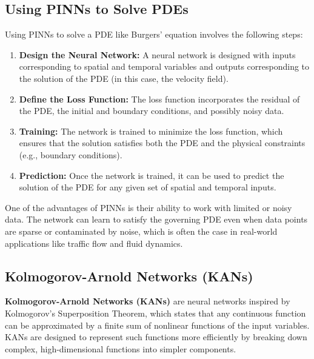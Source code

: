 \documentclass[conference]{IEEEtran}
\begin{document}
\subsection{Using PINNs to Solve PDEs}

Using PINNs to solve a PDE like Burgers’ equation involves the following steps:
\begin{enumerate}
    \item \textbf{Design the Neural Network:} A neural network is designed with inputs corresponding to spatial and temporal variables and outputs corresponding to the solution of the PDE (in this case, the velocity field).
    \item \textbf{Define the Loss Function:} The loss function incorporates the residual of the PDE, the initial and boundary conditions, and possibly noisy data.
    \item \textbf{Training:} The network is trained to minimize the loss function, which ensures that the solution satisfies both the PDE and the physical constraints (e.g., boundary conditions).
    \item \textbf{Prediction:} Once the network is trained, it can be used to predict the solution of the PDE for any given set of spatial and temporal inputs.
\end{enumerate}

One of the advantages of PINNs is their ability to work with limited or noisy data. The network can learn to satisfy the governing PDE even when data points are sparse or contaminated by noise, which is often the case in real-world applications like traffic flow and fluid dynamics.

\subsection{Kolmogorov-Arnold Networks (KANs)}

\textbf{Kolmogorov-Arnold Networks (KANs)} are neural networks inspired by Kolmogorov’s Superposition Theorem, which states that any continuous function can be approximated by a finite sum of nonlinear functions of the input variables. KANs are designed to represent such functions more efficiently by breaking down complex, high-dimensional functions into simpler components.
\end{document}
